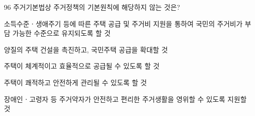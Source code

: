 \begin{question}{96}
주거기본법상 주거정책의 기본원칙에 해당하지 않는 것은?
\begin{choices}
  \item 소득수준ㆍ생애주기 등에 따른 주택 공급 및 주거비 지원을 통하여 국민의 주거비가 부담 가능한 수준으로 유지되도록 할 것
  \item 양질의 주택 건설을 촉진하고, 국민주택 공급을 확대할 것
  \item 주택이 체계적이고 효율적으로 공급될 수 있도록 할 것
  \item 주택이 쾌적하고 안전하게 관리될 수 있도록 할 것
  \item 장애인ㆍ고령자 등 주거약자가 안전하고 편리한 주거생활을 영위할 수 있도록 지원할 것
\end{choices}
\end{question}
